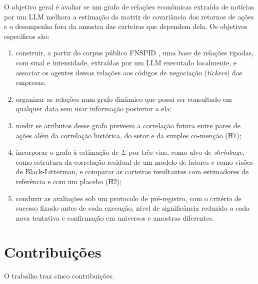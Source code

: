 O objetivo geral é avaliar se um grafo de relações econômicas extraído de notícias por um LLM melhora
a estimação da matriz de covariância dos retornos de ações e o desempenho fora da amostra das carteiras
que dependem dela. Os objetivos específicos são:

\begin{enumerate}
  \item construir, a partir do corpus público FNSPID \citep{dong2024fnspid}, uma base de relações
        tipadas, com sinal e intensidade, extraídas por um LLM executado localmente, e associar os
        agentes dessas relações aos códigos de negociação (\emph{tickers}) das empresas;
  \item organizar as relações num grafo dinâmico que possa ser consultado em qualquer data sem usar
        informação posterior a ela;
  \item medir se atributos desse grafo preveem a correlação futura entre pares de ações além da
        correlação histórica, do setor e da simples co-menção (H1);
  \item incorporar o grafo à estimação de $\Sigma$ por três vias, como alvo de \emph{shrinkage}, como
        estrutura da correlação residual de um modelo de fatores e como visões de Black-Litterman, e
        comparar as carteiras resultantes com estimadores de referência e com um placebo (H2);
  \item conduzir as avaliações sob um protocolo de pré-registro, com o critério de sucesso fixado
        antes de cada execução, nível de significância reduzido a cada nova tentativa e confirmação em
        universos e amostras diferentes.
\end{enumerate}

\section{Contribuições}
\label{sec:contribuicoes}

O trabalho traz cinco contribuições.

